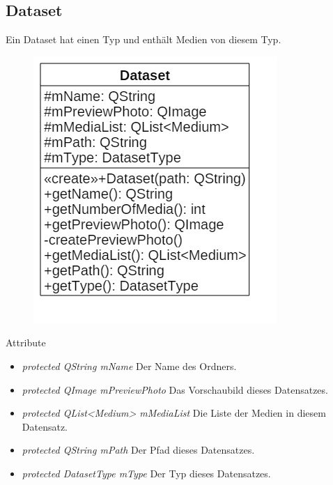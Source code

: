 \subsection*{Dataset}
Ein Dataset hat einen Typ und enthält Medien von diesem Typ.

\begin{figure}[H]
\centering
\includegraphics[scale=0.5]{img/Klassendiagramm/Klassen/Model/Dataset}
\label{fig:dataset}
\end{figure}

Attribute
\begin{itemize}
\item\textit{protected QString mName} Der Name des Ordners.
\item\textit{protected QImage mPreviewPhoto} Das Vorschaubild dieses Datensatzes.
\item\textit{protected QList<Medium> mMediaList} Die Liste der Medien in diesem Datensatz.
\item\textit{protected QString mPath} Der Pfad dieses Datensatzes.
\item\textit{protected DatasetType mType} Der Typ dieses Datensatzes.
\end{itemize}

